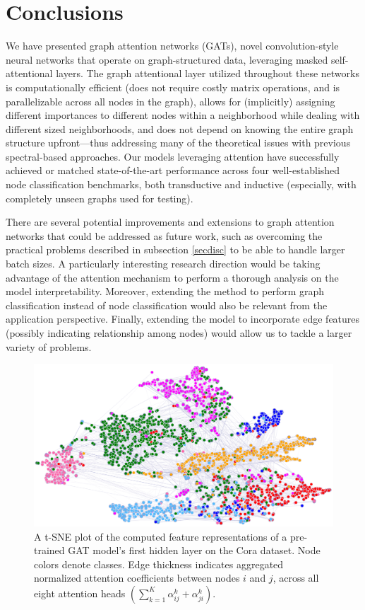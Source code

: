 \documentclass{article} %
\begin{document}
\section{Conclusions}
We have presented graph attention networks (GATs), novel convolution-style neural networks that operate on graph-structured data, leveraging masked self-attentional layers. The graph attentional layer utilized throughout these networks is computationally efficient (does not require costly matrix operations, and is parallelizable across all nodes in the graph), allows for (implicitly) assigning different importances to different nodes within a neighborhood while dealing with different sized neighborhoods, and does not depend on knowing the entire graph structure upfront---thus addressing many of the theoretical issues with previous spectral-based approaches. Our models leveraging attention have successfully achieved or matched state-of-the-art performance across four well-established node classification benchmarks, both transductive and inductive (especially, with completely unseen graphs used for testing).

There are several potential improvements and extensions to graph attention networks that could be addressed as future work, such as overcoming the practical problems described in subsection \ref{secdisc} to be able to handle larger batch sizes. A particularly interesting research direction would be taking advantage of the attention mechanism to perform a thorough analysis on the model interpretability. Moreover, extending the method to perform graph classification instead of node classification would also be relevant from the application perspective. Finally, extending the model to incorporate edge features (possibly indicating relationship among nodes) would allow us to tackle a larger variety of problems.

\begin{figure}[h!]
\begin{center}
	\includegraphics[width=0.9\linewidth]{t-sne.png}
\end{center}
\caption{A t-SNE plot of the computed feature representations of a pre-trained GAT model's first hidden layer on the Cora dataset. Node colors denote classes. Edge thickness indicates aggregated normalized attention coefficients between nodes $i$ and $j$, across all eight attention heads $(\sum_{k=1}^K\alpha^k_{ij} + \alpha^k_{ji})$.}
\label{tsneee}
\end{figure}
\end{document}
